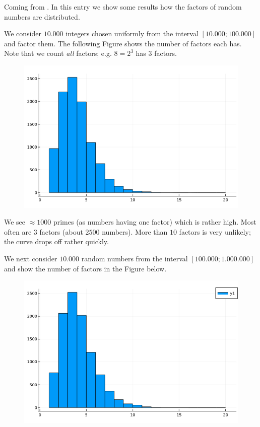 
Coming from \cite{Burton2011}. In this entry we show some results how the factors of random numbers are distributed.

We consider $10.000$ integers chosen uniformly from the interval $[10.000 ; 100.000]$ and factor them. The following Figure shows the number of factors each has. Note that we count \emph{all} factors; e.g. $8 = 2^3$ has $3$ factors.

\begin{figure}[H]
    \centering
    \includegraphics[scale=0.5]{images/primes_03_01.png}
\end{figure}


We see $\approx 1000$ primes (as numbers having one factor) which is rather high. Most often are $3$ factors (about $2500$ numbers). More than $10$ factors is very unlikely; the curve drops off rather quickly.

We next consider $10.000$ random numbers from the interval $[100.000 ; 1.000.000]$ and show the number of factors in the Figure below.

\begin{figure}[H]
    \centering
    \includegraphics[scale=0.5]{images/primes_03_02.png}
\end{figure}


